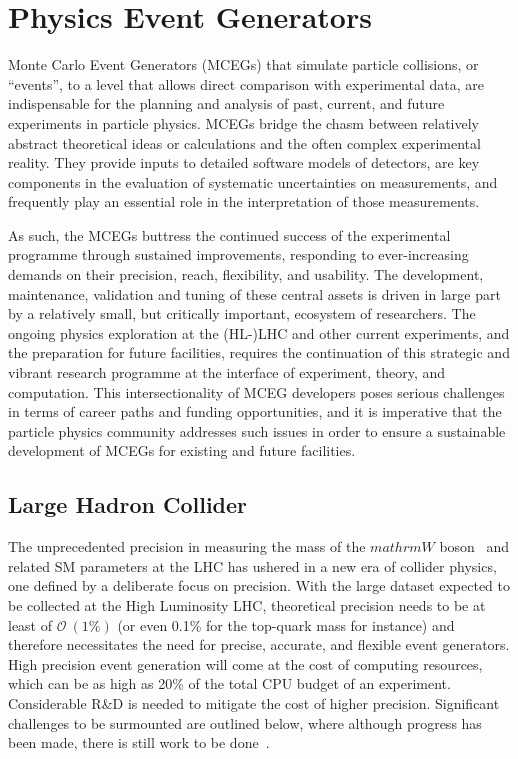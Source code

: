 \documentclass[10pt,a4paper]{article}
\begin{document}
\section{Physics Event Generators}\label{physics-event-generators}

Monte Carlo Event Generators (MCEGs) that simulate particle collisions,
or ``events'', to a level that allows direct comparison with
experimental data, are indispensable for the planning and analysis of
past, current, and future experiments in particle physics. MCEGs bridge
the chasm between relatively abstract theoretical ideas or calculations
and the often complex experimental reality. They provide inputs to
detailed software models of detectors, are key components in the
evaluation of systematic uncertainties on measurements, and frequently
play an essential role in the interpretation of those measurements.

As such, the MCEGs buttress the continued success of the experimental
programme through sustained improvements, responding to ever-increasing
demands on their precision, reach, flexibility, and usability. The
development, maintenance, validation and tuning of these central assets
is driven in large part by a relatively small, but critically important,
ecosystem of researchers. The ongoing physics exploration at the
(HL-)LHC and other current experiments, and the preparation for future
facilities, requires the continuation of this strategic and vibrant
research programme at the interface of experiment, theory, and
computation. This intersectionality of MCEG developers poses serious
challenges in terms of career paths and funding opportunities, and it is
imperative that the particle physics community addresses such issues in
order to ensure a sustainable development of MCEGs for existing and
future facilities.

\subsection{Large Hadron Collider}\label{large-hadron-collider}

The unprecedented precision in measuring the mass of the
$mathrm{W}$
boson~\cite{CMS:2024lrd} and related SM
parameters at the LHC has ushered in a new era of collider physics, one
defined by a deliberate focus on precision. With the large dataset
expected to be collected at the High Luminosity LHC, theoretical
precision needs to be at least of
$\mathcal{O}~(1\%)$ (or even
0.1\% for the top-quark mass for instance) and therefore necessitates
the need for precise, accurate, and flexible event generators. High
precision event generation will come at the cost of computing resources,
which can be as high as 20\% of the total CPU budget of an
experiment. Considerable R\&D is needed to mitigate the
cost of higher precision. Significant challenges to be surmounted are
outlined below, where although progress has been made, there is still
work to be
done~\cite{HSFPhysicsEventGeneratorWG:2020gxw,maltoni2022tf07snowmassreporttheory,10.21468/SciPostPhys.16.5.130}.
\end{document}

